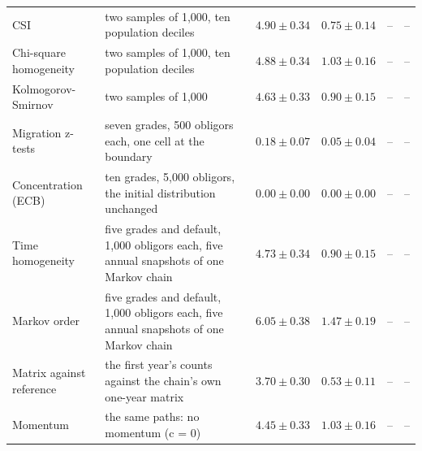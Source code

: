 \begin{table}[htbp]
\begin{tabular}{lp{3.1cm}rrrr}
CSI & two samples of 1,000, ten population deciles & $4.90\pm0.34$ & $0.75\pm0.14$ & -- & -- \\
Chi-square homogeneity & two samples of 1,000, ten population deciles & $4.88\pm0.34$ & $1.03\pm0.16$ & -- & -- \\
Kolmogorov-Smirnov & two samples of 1,000 & $4.63\pm0.33$ & $0.90\pm0.15$ & -- & -- \\
Migration z-tests & seven grades, 500 obligors each, one cell at the boundary & $0.18\pm0.07$ & $0.05\pm0.04$ & -- & -- \\
Concentration (ECB) & ten grades, 5,000 obligors, the initial distribution unchanged & $0.00\pm0.00$ & $0.00\pm0.00$ & -- & -- \\
Time homogeneity & five grades and default, 1,000 obligors each, five annual snapshots of one Markov chain & $4.73\pm0.34$ & $0.90\pm0.15$ & -- & -- \\
Markov order & five grades and default, 1,000 obligors each, five annual snapshots of one Markov chain & $6.05\pm0.38$ & $1.47\pm0.19$ & -- & -- \\
Matrix against reference & the first year's counts against the chain's own one-year matrix & $3.70\pm0.30$ & $0.53\pm0.11$ & -- & -- \\
Momentum & the same paths: no momentum (c = 0) & $4.45\pm0.33$ & $1.03\pm0.16$ & -- & -- \\
\bottomrule
\end{tabular}
\end{table}
